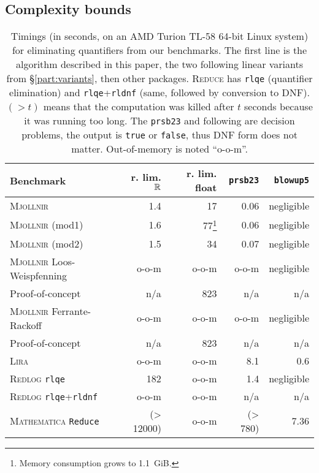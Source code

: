 \subsection{Complexity bounds}
\label{part:complexity}
\begin{table}[htb]\renewcommand{\footnoterule}{}\makeatletter \setlength{\skip\@mpfootins}{1ex}\makeatother \begin{minipage}{\textwidth}\begin{center}\small \begin{tabular}{|l|r|r|r|r|}
\hline
Benchmark & r. lim. $\mathbb{R}$ & r. lim. float & \texttt{prsb23} & \texttt{blowup5} \\
\hline
\textsc{Mjollnir} & 1.4 & 17 & 0.06 & negligible \\
\textsc{Mjollnir} (mod1) & 1.6 & 77\footnote{Memory consumption grows to 1.1~GiB.} & 0.06 & negligible\\
\textsc{Mjollnir} (mod2) & 1.5 & 34 & 0.07 & negligible\\
\textsc{Mjollnir} Loos-Weispfenning & o-o-m & o-o-m & o-o-m & negligible \\
Proof-of-concept & n/a & 823 & n/a & n/a \\
\textsc{Mjollnir} Ferrante-Rackoff & o-o-m & o-o-m & o-o-m & negligible \\
Proof-of-concept & n/a & 823 & n/a & n/a \\
\textsc{Lira} & o-o-m & o-o-m & 8.1 & 0.6\\
\textsc{Redlog} \texttt{rlqe} & 182  & o-o-m & 1.4 & negligible \\
\textsc{Redlog} \texttt{rlqe}+\texttt{rldnf} & o-o-m  & o-o-m  & n/a & n/a\\
\textsc{Mathematica} \texttt{Reduce} & (> 12000) & o-o-m & (> 780) & 7.36\\
\hline
\end{tabular}
\end{center}
\end{minipage}

\caption{Timings (in seconds, on an AMD Turion TL-58 64-bit Linux system) for eliminating quantifiers from our benchmarks. The first line is the algorithm described in this paper, the two following linear variants from \S\ref{part:variants}, then other packages. \textsc{Reduce} has \texttt{rlqe} (quantifier elimination) and \texttt{rlqe}+\texttt{rldnf} (same, followed by conversion to DNF). $(> t)$ means that the computation was killed after $t$ seconds because it was running too long. The \texttt{prsb23} and following are decision problems, the output is \texttt{true} or \texttt{false}, thus DNF form does not matter. Out-of-memory is noted ``o-o-m''.}
\label{tab:benchmarks1}
\end{table}

